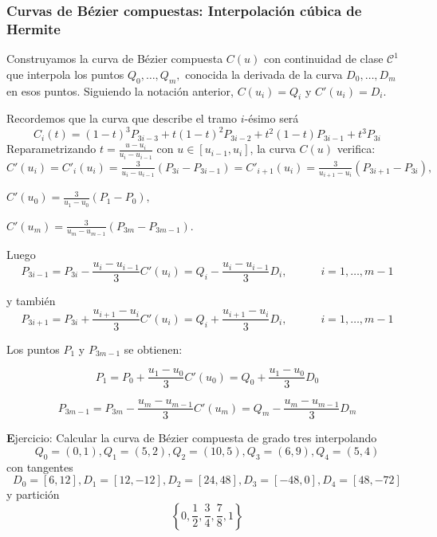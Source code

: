\documentclass[ebook,oneside]{memoir}
\begin{document}
\subsubsection{Curvas de B\'{e}zier compuestas: Interpolaci\'{o}n c\'{u}bica de Hermite}

Construyamos la curva de B\'{e}zier compuesta $C(u)$ con continuidad de clase ${\mathcal  C}^1$ que interpola los puntos
$Q_0,\ldots,Q_m,$ conocida la derivada de la curva $D_0,\ldots,D_m$ en esos puntos. Siguiendo la notaci\'{o}n anterior, $C(u_i)=Q_i$ y $C'(u_i)=D_i$.

\vspace{0.2cm}

Recordemos que la curva que describe el tramo $i$-\'{e}simo ser\'{a}
$$C_i(t)=(1-t)^3P_{3i-3}+t(1-t)^2P_{3i-2}+t^2(1-t)P_{3i-1}+t^3P_{3i}$$
Reparametrizando $t=\frac{u-u_i}{u_i-u_{i-1}}$ con $u\in [u_{i-1},u_i]$, la curva $C(u)$ verifica: $C'(u_i)=C'_{i}(u_i)=\frac{3}{u_i-u_{i-1}}(P_{3i}-P_{3i-1})=C'_{i+1}(u_i)=\frac{3}{u_{i+1}-u_{i}}(P_{3i+1}-P_{3i}),$

\vspace{0.2cm}

$C'(u_0)=\frac{3}{u_1-u_0}(P_1-P_0),$

\vspace{0.2cm}
$C'(u_m)=\frac{3}{u_m-u_{m-1}}(P_{3m}-P_{3m-1})$.

\vspace{0.3cm}

Luego
$$P_{3i-1}=P_{3i}-\frac{u_i-u_{i-1}}{3} C'(u_i)=Q_i-\frac{u_i-u_{i-1}}{3} D_i, \quad \quad \quad i=1,\ldots,m-1$$

y tambi\'{e}n
$$P_{3i+1}=P_{3i}+\frac{u_{i+1}-u_{i}}{3} C'(u_i)=Q_i+\frac{u_{i+1}-u_{i}}{3} D_i, \quad \quad \quad i=1,\ldots,m-1$$

Los puntos $P_1$ y $P_{3m-1}$ se obtienen:

$$P_1=P_0+\frac{u_1-u_{0}}{3} C'(u_0)=Q_0+\frac{u_1-u_{0}}{3} D_0$$

$$P_{3m-1}=P_{3m}-\frac{u_m-u_{m-1}}{3} C'(u_m)=Q_m-\frac{u_m-u_{m-1}}{3} D_m$$

\vspace{0.3cm}

{\textbf Ejercicio:}
Calcular la curva de B\'{e}zier compuesta de grado tres interpolando
$$Q_0=(0,1) , Q_1=(5,2),Q_2=(10,5),Q_3=(6,9),Q_4=(5,4)$$
con tangentes
$$D_0=[6,12] , D_1=[12,-12],D_2=[24,48],D_3=[-48,0],D_4=[48,-72]$$
y partici\'{o}n
$$\left\{0,\frac{1}{2}, \frac{3}{4},\frac{7}{8},1 \right\}$$
\end{document}
